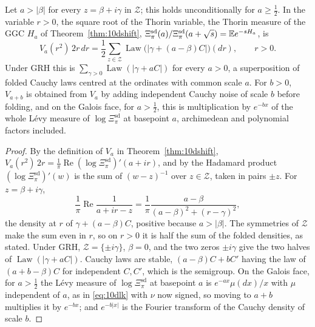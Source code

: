 \begin{theorem}\label{thm:lapcauchy}
Let $a>|\beta|$ for every $z=\beta+i\gamma$ in $\mathcal Z$; this holds unconditionally for $a\ge\frac12$. In the variable $r>0$, the square root of the Thorin variable, the Thorin measure of the GGC $H_a$ of Theorem~\ref{thm:10dshift}, $\Xi^{\mathrm{sd}}_\pi(a)/\Xi^{\mathrm{sd}}_\pi(a+\sqrt s)=\mathbb{E} e^{-sH_a}$, is
\[
V_a(r^2)\,2r\,dr=\frac12\sum_{z\in\mathcal Z}\operatorname{Law}\bigl(|\gamma+(a-\beta)C|\bigr)(dr),\qquad r>0 .
\]
Under GRH this is $\sum_{\gamma>0}\operatorname{Law}(|\gamma+aC|)$ for every $a>0$, a superposition of folded Cauchy laws centred at the ordinates with common scale $a$. For $b>0$, $V_{a+b}$ is obtained from $V_a$ by adding independent Cauchy noise of scale $b$ before folding, and on the Galois face, for $a>\frac12$, this is multiplication by $e^{-bx}$ of the whole L\'evy measure of $\log\Xi^{\mathrm{sd}}_\pi$ at basepoint $a$, archimedean and polynomial factors included.
\end{theorem}

\begin{proof}
By the definition of $V_a$ in Theorem~\ref{thm:10dshift}, $V_a(r^2)\,2r=\frac1\pi\operatorname{Re}(\log\Xi^{\mathrm{sd}}_\pi)'(a+ir)$, and by the Hadamard product $(\log\Xi^{\mathrm{sd}}_\pi)'(w)$ is the sum of $(w-z)^{-1}$ over $z\in\mathcal Z$, taken in pairs $\pm z$. For $z=\beta+i\gamma$,
\[
\frac1\pi\operatorname{Re}\frac1{a+ir-z}=\frac1\pi\frac{a-\beta}{(a-\beta)^2+(r-\gamma)^2},
\]
the density at $r$ of $\gamma+(a-\beta)C$, positive because $a>|\beta|$. The symmetries of $\mathcal Z$ make the sum even in $r$, so on $r>0$ it is half the sum of the folded densities, as stated. Under GRH, $\mathcal Z=\{\pm i\gamma\}$, $\beta=0$, and the two zeros $\pm i\gamma$ give the two halves of $\operatorname{Law}(|\gamma+aC|)$. Cauchy laws are stable, $(a-\beta)C+bC'$ having the law of $(a+b-\beta)C$ for independent $C,C'$, which is the semigroup. On the Galois face, for $a>\frac12$ the L\'evy measure of $\log\Xi^{\mathrm{sd}}_\pi$ at basepoint $a$ is $e^{-ax}\mu(dx)/x$ with $\mu$ independent of $a$, as in \eqref{eq:10dlk} with $\nu$ now signed, so moving to $a+b$ multiplies it by $e^{-bx}$; and $e^{-b|x|}$ is the Fourier transform of the Cauchy density of scale $b$.
\end{proof}

